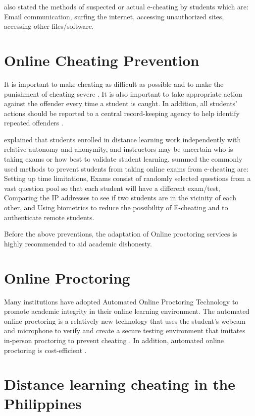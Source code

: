  also stated the methods of suspected or actual e-cheating by students which are: Email communication, surfing the internet, accessing unauthorized sites, accessing other files/software.

\section*{Online Cheating Prevention}

It is important to make cheating as difficult as possible and to make the punishment of cheating severe \cite{genereux1995circumstances}.
It is also important to take appropriate action against the offender every time a student is caught.
In addition, all students’ actions should be reported to a central record-keeping agency to help identify repeated offenders \cite{todd1987cheating}.

 explained that students enrolled in distance learning work independently with relative autonomy and anonymity, and instructors may be uncertain who is taking exams or how best to validate student learning.
 summed the commonly used methods to prevent students from taking online exams from e-cheating are: Setting up time limitations, Exams consist of randomly selected questions from a vast question pool so that each student will have a different exam/test, Comparing the IP addresses to see if two students are in the vicinity of each other, and Using biometrics to reduce the possibility of E-cheating and to authenticate remote students.

Before the above preventions, the adaptation of Online proctoring services is highly recommended to aid academic dishonesty.

\section*{Online Proctoring}

Many institutions have adopted Automated Online Proctoring Technology to promote academic integrity in their online learning environment.
The automated online proctoring is a relatively new technology that uses the student’s webcam and microphone to verify and create a secure testing environment that imitates in-person proctoring to prevent cheating \cite{karim2014cheating}.
In addition, automated online proctoring is cost-efficient \cite{atoum2017automated}.

\section*{Distance learning cheating in the Philippines}

